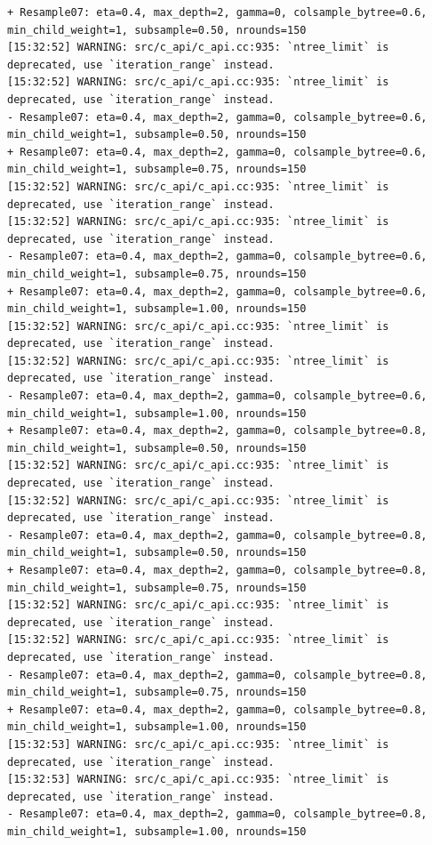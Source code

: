 \documentclass[
  letterpaper,
  DIV=11,
  numbers=noendperiod]{scrartcl}
\begin{document}
\begin{verbatim}
+ Resample07: eta=0.4, max_depth=2, gamma=0, colsample_bytree=0.6, min_child_weight=1, subsample=0.50, nrounds=150 
[15:32:52] WARNING: src/c_api/c_api.cc:935: `ntree_limit` is deprecated, use `iteration_range` instead.
[15:32:52] WARNING: src/c_api/c_api.cc:935: `ntree_limit` is deprecated, use `iteration_range` instead.
- Resample07: eta=0.4, max_depth=2, gamma=0, colsample_bytree=0.6, min_child_weight=1, subsample=0.50, nrounds=150 
+ Resample07: eta=0.4, max_depth=2, gamma=0, colsample_bytree=0.6, min_child_weight=1, subsample=0.75, nrounds=150 
[15:32:52] WARNING: src/c_api/c_api.cc:935: `ntree_limit` is deprecated, use `iteration_range` instead.
[15:32:52] WARNING: src/c_api/c_api.cc:935: `ntree_limit` is deprecated, use `iteration_range` instead.
- Resample07: eta=0.4, max_depth=2, gamma=0, colsample_bytree=0.6, min_child_weight=1, subsample=0.75, nrounds=150 
+ Resample07: eta=0.4, max_depth=2, gamma=0, colsample_bytree=0.6, min_child_weight=1, subsample=1.00, nrounds=150 
[15:32:52] WARNING: src/c_api/c_api.cc:935: `ntree_limit` is deprecated, use `iteration_range` instead.
[15:32:52] WARNING: src/c_api/c_api.cc:935: `ntree_limit` is deprecated, use `iteration_range` instead.
- Resample07: eta=0.4, max_depth=2, gamma=0, colsample_bytree=0.6, min_child_weight=1, subsample=1.00, nrounds=150 
+ Resample07: eta=0.4, max_depth=2, gamma=0, colsample_bytree=0.8, min_child_weight=1, subsample=0.50, nrounds=150 
[15:32:52] WARNING: src/c_api/c_api.cc:935: `ntree_limit` is deprecated, use `iteration_range` instead.
[15:32:52] WARNING: src/c_api/c_api.cc:935: `ntree_limit` is deprecated, use `iteration_range` instead.
- Resample07: eta=0.4, max_depth=2, gamma=0, colsample_bytree=0.8, min_child_weight=1, subsample=0.50, nrounds=150 
+ Resample07: eta=0.4, max_depth=2, gamma=0, colsample_bytree=0.8, min_child_weight=1, subsample=0.75, nrounds=150 
[15:32:52] WARNING: src/c_api/c_api.cc:935: `ntree_limit` is deprecated, use `iteration_range` instead.
[15:32:52] WARNING: src/c_api/c_api.cc:935: `ntree_limit` is deprecated, use `iteration_range` instead.
- Resample07: eta=0.4, max_depth=2, gamma=0, colsample_bytree=0.8, min_child_weight=1, subsample=0.75, nrounds=150 
+ Resample07: eta=0.4, max_depth=2, gamma=0, colsample_bytree=0.8, min_child_weight=1, subsample=1.00, nrounds=150 
[15:32:53] WARNING: src/c_api/c_api.cc:935: `ntree_limit` is deprecated, use `iteration_range` instead.
[15:32:53] WARNING: src/c_api/c_api.cc:935: `ntree_limit` is deprecated, use `iteration_range` instead.
- Resample07: eta=0.4, max_depth=2, gamma=0, colsample_bytree=0.8, min_child_weight=1, subsample=1.00, nrounds=150 

\end{verbatim}
\end{document}
